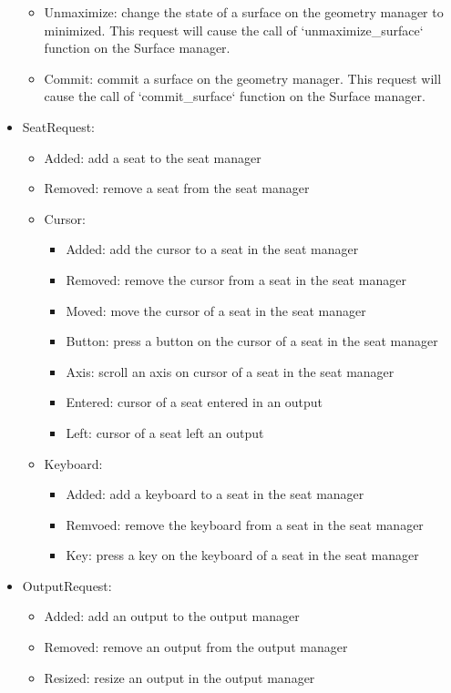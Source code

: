 \begin{itemize}
\begin{itemize}
		\item Unmaximize: change the state of a surface on the geometry manager to minimized. This request will cause the call of `unmaximize\_surface` function on the Surface manager.
		\item Commit: commit a surface on the geometry manager. This request will cause the call of `commit\_surface` function on the Surface manager.
	\end{itemize}
	\item SeatRequest: 
	\begin{itemize}
		\item Added: add a seat to the seat manager
		\item Removed: remove a seat from the seat manager
		\item Cursor: \begin{itemize}
			\item Added: add the cursor to a seat in the seat manager
			\item Removed: remove the cursor from a seat in the seat manager
			\item Moved: move the cursor of a seat in the seat manager
			\item Button: press a button on the cursor of a seat in the seat manager
			\item Axis: scroll an axis on cursor of a seat in the seat manager
			\item Entered: cursor  of a seat  entered in an output
			\item Left: cursor  of a seat  left an output
		\end{itemize}
		\item Keyboard: \begin{itemize}
			\item Added: add a keyboard to a seat in the seat manager
			\item Remvoed: remove the keyboard from a seat in the seat manager
			\item Key: press a key on the keyboard of a seat in the seat manager
		\end{itemize}
	\end{itemize}
	\item OutputRequest:\begin{itemize}
		\item Added: add an output to the output manager
		\item Removed: remove an output from the output manager
		\item Resized: resize an output in the output manager
	\end{itemize}
\end{itemize}

